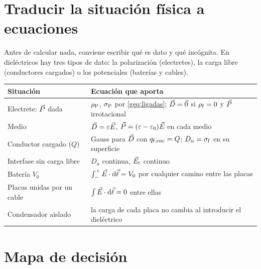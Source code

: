 \section{Traducir la situación física a ecuaciones}\label{gsec:traducir}

Antes de calcular nada, conviene escribir qué es dato y qué incógnita. En dieléctricos hay tres tipos de dato:
la polarización (electretes), la carga libre (conductores cargados) o los potenciales (baterías y cables).

\begin{center}
\small
\begin{tabularx}{\textwidth}{@{}>{\raggedright\arraybackslash}p{4.4cm}>{\raggedright\arraybackslash}X@{}}
\toprule
Situación & Ecuación que aporta\\
\midrule
Electrete: $\vec P$ dada & $\rho_{\mathrm P}$, $\sigma_{\mathrm P}$ por \eqref{geq:ligadas}; $\vec D=\vec 0$ si $\rho_{\mathrm f}=0$ y $\vec P$ irrotacional\\
Medio \LHI{} & $\vec D=\varepsilon\vec E$, $\vec P=(\varepsilon-\varepsilon_0)\vec E$ en cada medio\\
Conductor cargado ($Q$) & Gauss para $\vec D$ con $q_{\mathrm{f,enc}}=Q$; $D_n=\sigma_{\mathrm f}$ en su superficie\\
Interfase sin carga libre & $D_n$ continua, $\vec E_t$ continuo\\
Batería $V_0$ & $\int_{-}^{+}\vec E\cdot\mathop{}\!\mathrm{d}\vec\ell=V_0$ por cualquier camino entre las placas\\
Placas unidas por un cable & $\int\vec E\cdot\mathop{}\!\mathrm{d}\vec\ell=0$ entre ellas\\
Condensador aislado & la carga de cada placa no cambia al introducir el dieléctrico\\
\bottomrule
\end{tabularx}
\end{center}

\section{Mapa de decisión}\label{gsec:mapa}

